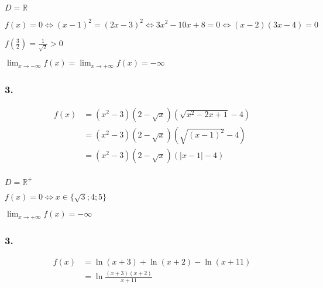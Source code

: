 \documentclass[a4paper,10pt]{report}
\begin{document}
$D = \mathbb{R}$

$f(x) = 0 \Longleftrightarrow (x-1)^2 = (2x-3)^2 \Longleftrightarrow 3x^2 -10x +8 =0 \Longleftrightarrow (x-2)(3x-4) =0$

$f(\frac{3}{2}) = \frac{1}{\sqrt{2}} > 0$

$\lim_{x \rightarrow -\infty} f(x) = \lim_{x \rightarrow +\infty} f(x) = -\infty$



\subsubsection*{3.}
\begin{equation*}
	\begin{split}
		f(x) &= (x^2-3)(2-\sqrt{x})(\sqrt{x^2-2x+1}-4) \\
		     &= (x^2-3)(2-\sqrt{x})(\sqrt{(x-1)^2}-4) \\
		     &= (x^2-3)(2-\sqrt{x})(|x-1|-4) \\
	\end{split}
\end{equation*}

$D = \mathbb{R}^{+}$

$f(x) = 0 \Longleftrightarrow x \in \{ \sqrt{3} ; 4 ; 5 \}$

$\lim_{x \rightarrow +\infty} f(x) = -\infty$



\subsubsection*{3.}
\begin{equation*}
	\begin{split}
		f(x) &= \ln(x+3) + \ln(x+2) - \ln(x+11) \\
		&= \ln \frac{(x+3)(x+2)}{x+11}
	\end{split}
\end{equation*}
\end{document}
